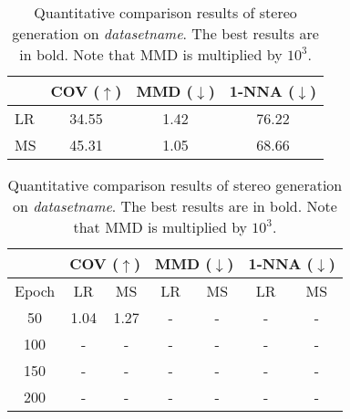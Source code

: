 \begin{table}[t]
    \centering
    \begin{tabular}{l|c|c|c}
        \toprule
         & COV ($\uparrow$) & MMD ($\downarrow$) & 1-NNA ($\downarrow$)\\
         \midrule
         LR & 34.55 & 1.42 & 76.22 \\
         MS & 45.31 & 1.05 & 68.66 \\
         \bottomrule
         
    \end{tabular}
    \caption{Quantitative comparison results of stereo generation on \textit{datasetname}.
    	The best results are in bold.
    	Note that MMD is multiplied by $10^3$. }
    \label{table:result}
\end{table}

\begin{table}[t]
\centering
    \begin{tabular}{c|cc|cc|cc}
		\toprule
		 & \multicolumn{2}{c|}{COV ($\uparrow$)} & \multicolumn{2}{c|}{MMD ($\downarrow$)} &  \multicolumn{2}{c}{1-NNA ($\downarrow$)}\\
		\midrule
		Epoch & \multicolumn{1}{c|}{LR} & \multicolumn{1}{c|}{MS} & \multicolumn{1}{c|}{LR} & \multicolumn{1}{c|}{MS} & \multicolumn{1}{c|}{LR} & \multicolumn{1}{c}{MS} \\
		\midrule
		50&  1.04 & 1.27 & - & - & - & - \\
		100&  - & - & - & - & - & - \\
		150&  - & - & - & - & - & - \\
		200&  - & - & - & - & - & - \\
		\bottomrule
	\end{tabular}
    \caption{
    	Quantitative comparison results of stereo generation on \textit{datasetname}.
    	The best results are in bold.
    	Note that MMD is multiplied by $10^3$. 
    }
    \label{table:result}
    
\end{table}
\fi